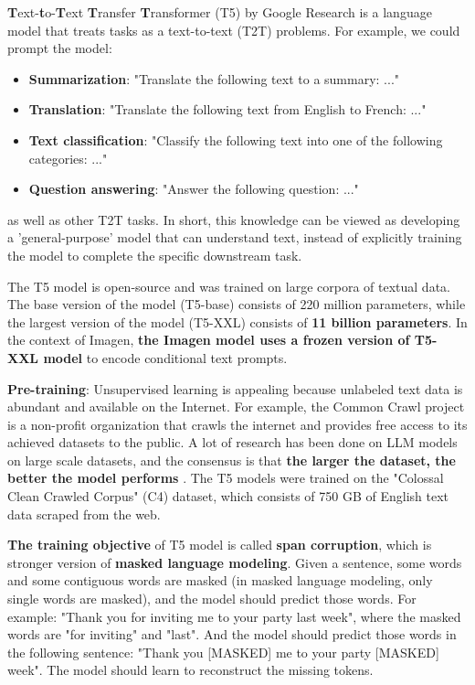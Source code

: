 \textbf{T}ext-\textbf{t}o-\textbf{T}ext \textbf{T}ransfer \textbf{T}ransformer (T5) \cite{t5_model} by Google Research is a language model that treats tasks as a text-to-text (T2T) problems. For example, we could prompt the model:

\begin{itemize}
    \item \textbf{Summarization}: "Translate the following text to a summary: ..."
    \item \textbf{Translation}: "Translate the following text from English to French: ..."
    \item \textbf{Text classification}: "Classify the following text into one of the following categories: ..."
    \item \textbf{Question answering}: "Answer the following question: ..."
\end{itemize}

as well as other T2T tasks. In short, this knowledge can be viewed as developing a 'general-purpose' model that can understand text, instead of explicitly training the model to complete the specific downstream task.

The T5 model is open-source and was trained on large corpora of textual data. The base version of the model (T5-base) consists of 220 million parameters, while the largest version of the model (T5-XXL) consists of \textbf{11 billion parameters}. In the context of Imagen, \textbf{the Imagen model uses a frozen version of T5-XXL model} to encode conditional text prompts.

\textbf{Pre-training}: Unsupervised learning is appealing because unlabeled text data is abundant and available on the Internet. For example, the Common Crawl project \cite{common_crawl_project} is a non-profit organization that crawls the internet and provides free access to its achieved datasets to the public. A lot of research has been done on LLM models on large scale datasets, and the consensus is that \textbf{the larger the dataset, the better the model performs} \cite{radford2019language} \cite{jozefowicz2016exploring} \cite{hestness2017deep}. The T5 models were trained on the "Colossal Clean Crawled Corpus" (C4) dataset, which consists of 750 GB of English text data scraped from the web.

\textbf{The training objective} of T5 model is called \textbf{span corruption}, which is stronger version of \textbf{masked language modeling}. Given a sentence, some words and some contiguous words are masked (in masked language modeling, only single words are masked), and the model should predict those words. For example: "Thank you for inviting me to your party last week", where the masked words are "for inviting" and "last". And the model should predict those words in the following sentence: "Thank you [MASKED] me to your party [MASKED] week". The model should learn to reconstruct the missing tokens.

